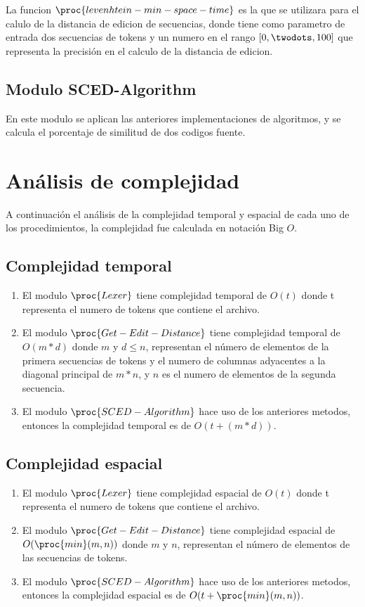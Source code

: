 La funcion $\proc{levenhtein-min-space-time}$ es la que se utilizara para el calulo de la distancia de edicion de secuencias, donde tiene como parametro de entrada dos secuencias de tokens y un numero  en el rango $[0, \twodots, 100]$ que representa la precisión en el calculo de la distancia de edicion.

\subsection{Modulo SCED-Algorithm}
En este modulo se aplican las anteriores implementaciones de algoritmos, y se calcula el porcentaje de similitud de dos codigos fuente.


\section{Análisis de complejidad}
A continuación el análisis de la complejidad temporal y espacial de cada uno de los procedimientos, la complejidad fue calculada en notación Big $O$.
\subsection{Complejidad temporal}
\begin{enumerate}
  \item El modulo $\proc{Lexer}$ tiene complejidad temporal de $O(t)$ donde t representa el numero de tokens que contiene el archivo.
  \item El modulo $\proc{Get-Edit-Distance}$ tiene complejidad temporal de $O(m*d)$ donde $m$ y $d \leq n$, representan el número de elementos de la primera secuencias de tokens y el numero de columnas adyacentes a la diagonal principal de $m*n$, y $n$ es el numero de elementos de la segunda secuencia.
  \item El modulo $\proc{SCED-Algorithm}$ hace uso de los anteriores metodos, entonces la complejidad temporal es de $O(t + (m*d))$.
\end{enumerate}
\subsection{Complejidad espacial}
\begin{enumerate}
  \item El modulo $\proc{Lexer}$ tiene complejidad espacial de $O(t)$ donde t representa el numero de tokens que contiene el archivo.
  \item El modulo $\proc{Get-Edit-Distance}$ tiene complejidad espacial de $O(\proc{min}(m,n))$ donde $m$ y $n$, representan el número de elementos de las secuencias de tokens.
  \item El modulo $\proc{SCED-Algorithm}$ hace uso de los anteriores metodos, entonces la complejidad espacial es de $O(t + \proc{min}(m,n))$.
\end{enumerate}
